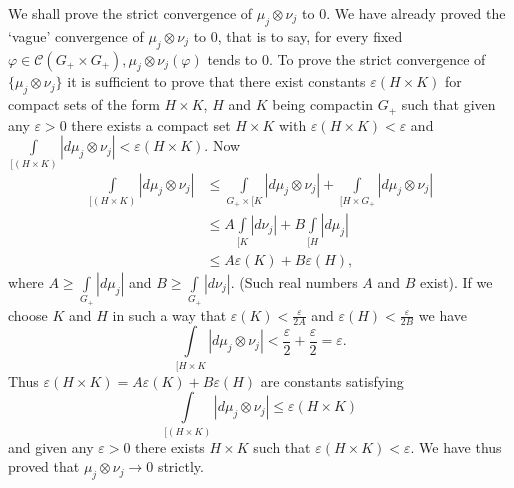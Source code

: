 We shall prove the strict convergence of $\mu_j \otimes \nu_j$ to
$0$. We have already proved the `vague' convergence of $\mu_j \otimes
\nu_j$ to $0$, that is to say, for every fixed $\varphi \in
\mathscr{C}(G_+ \times G_+), \mu_j \otimes \nu_j(\varphi)$ tends to
$0$. To prove the strict convergence of $\{\mu_j \otimes \nu_j\}$ it
is sufficient to prove that there exist constants $\varepsilon (H
\times K)$ for compact sets of the form $H \times K$, $H$ and $K$
being compact\pageoriginale in $G_+$ such that given any $\varepsilon
> 0$ there exists a compact set $H \times K$ with $\varepsilon (H
\times K) < \varepsilon$ and $\int\limits_{[(H\times K)} |d \mu_j
  \otimes \nu_j | < \varepsilon (H\times K)$. Now 
\begin{align*}
\int\limits_{[(H\times K)} |d \mu_j \otimes \nu_j |&\leq
  \int\limits_{G_+\times[K} |d \mu_j \otimes \nu_j | +
    \int\limits_{[H\times G_+} |d \mu_j \otimes \nu_j |\\
&\leq A \int\limits_{[K} |d \nu_j| + B \int\limits_{[H}|d \mu_j|\\
&\leq A \varepsilon (K) + B \varepsilon (H),
\end{align*}
where $A \geq \int\limits_{G_+}|d\mu_j|$ and $B \geq
\int\limits_{G_+}|d \nu_j|$. (Such real numbers $A$ and $B$ exist). If
we choose $K$ and $H$ in such a way that
$\varepsilon(K)<\frac{\varepsilon}{2A}$ and $\varepsilon (H) <
\frac{\varepsilon}{2B}$ we have 
$$
\int\limits_{[H\times K}|d \mu_j \otimes \nu_j| <
  \frac{\varepsilon}{2} + \frac{\varepsilon}{2} = \varepsilon .
$$
Thus $\varepsilon (H \times K)=A\varepsilon(K) + B \varepsilon(H)$ are
constants satisfying 
$$
\int\limits_{[(H\times K)}|d\mu_j \otimes \nu_j| \leq \varepsilon(H
  \times K)
$$
and given any $\varepsilon > 0$ there exists $H \times K$ such that
$\varepsilon(H \times K) < \varepsilon$. We have thus proved that
$\mu_j \otimes \nu_j \to 0$ strictly. 

